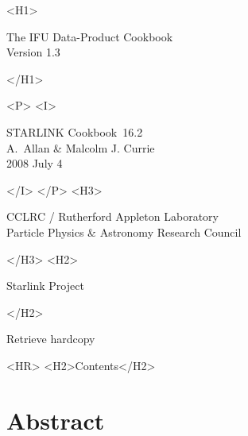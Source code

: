 \documentclass[twoside,11pt]{article}
\newcommand{\stardoccategory}  {STARLINK Cookbook}
\newcommand{\stardocsource}    {sc\stardocnumber}
\newcommand{\stardocnumber}    {16.2}
\newcommand{\stardocauthors}   {A.~Allan \& Malcolm J. Currie}
\newcommand{\stardocdate}      {2008 July 4}
\newcommand{\stardocversion}   {Version 1.3}
\newcommand{\stardoctitle}     {The IFU Data-Product Cookbook}
\newcommand{\stardocmanual}    {}
\newcommand{\htmladdnormallink}[2]{#1}
\newcommand{\htmladdimg}[1]{}
\newcommand{\htmlref}[2]{#1}
\newcommand{\htmladdtonavigation}[1]{}
\newcommand{\xlabel}[1]{}
\newcommand{\latexonlytoc}[0]{\tableofcontents}
\begin{document}
\begin{htmlonly}
   \xlabel{}
   \begin{rawhtml} <H1> \end{rawhtml}
      \stardoctitle\\
      \stardocversion\\
      \stardocmanual
   \begin{rawhtml} </H1> \end{rawhtml}

   \htmladdimg{sc16_cover.gif}


   \begin{rawhtml} <P> <I> \end{rawhtml}
   \stardoccategory\ \stardocnumber \\
   \stardocauthors \\
   \stardocdate
   \begin{rawhtml} </I> </P> <H3> \end{rawhtml}
      \htmladdnormallink{CCLRC}{http://www.cclrc.ac.uk} /
      \htmladdnormallink{Rutherford Appleton Laboratory}
                        {http://www.cclrc.ac.uk/ral} \\
      \htmladdnormallink{Particle Physics \& Astronomy Research Council}
                        {http://www.pparc.ac.uk} \\
   \begin{rawhtml} </H3> <H2> \end{rawhtml}
      \htmladdnormallink{Starlink Project}{http://star-www.rl.ac.uk/}
   \begin{rawhtml} </H2> \end{rawhtml}
   \htmladdnormallink{\htmladdimg{source.gif} Retrieve hardcopy}
      {http://star-www.rl.ac.uk/cgi-bin/hcserver?\stardocsource}\\

  \label{stardoccontents}
  \begin{rawhtml} 
    <HR>
    <H2>Contents</H2>
  \end{rawhtml}
  \newcommand{\latexonlytoc}[0]{}

  \section{\xlabel{abstract}Abstract}
\end{htmlonly}
\end{document}
